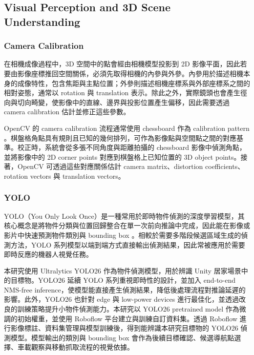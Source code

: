 \documentclass[12pt,a4paper]{article}
\begin{document}
\subsection{Visual Perception and 3D Scene Understanding}

\subsubsection{Camera Calibration}

在相機成像過程中，3D 空間中的點會經由相機模型投影到 2D 影像平面，因此若要由影像座標推回空間關係，必須先取得相機的內參與外參。內參用於描述相機本身的成像特性，包含焦距與主點位置；外參則描述相機座標系與外部座標系之間的相對姿態，通常以 rotation 與 translation 表示。除此之外，實際鏡頭也會產生徑向與切向畸變，使影像中的直線、邊界與投影位置產生偏移，因此需要透過 camera calibration 估計並修正這些參數。

OpenCV 的 camera calibration 流程通常使用 chessboard 作為 calibration pattern \cite{opencv_calib}。棋盤格角點具有規則且已知的幾何排列，可作為影像點與空間點之間的對應基準。校正時，系統會從多張不同角度與距離拍攝的 chessboard 影像中偵測角點，並將影像中的 2D corner points 對應到棋盤格上已知位置的 3D object points。接著，OpenCV 可透過這些對應關係估計 camera matrix、distortion coefficients、rotation vectors 與 translation vectors。

\subsubsection{YOLO}

YOLO（You Only Look Once）是一種常用於即時物件偵測的深度學習模型，其核心概念是將物件分類與位置回歸整合在單一次前向推論中完成，因此能在影像或影片中快速預測物件類別與 bounding box \cite{ultralytics_yolo}。相較於需要多階段候選區域生成的偵測方法，YOLO 系列模型以端到端方式直接輸出偵測結果，因此常被應用於需要即時反應的機器人視覺任務。

本研究使用 Ultralytics YOLO26 作為物件偵測模型，用於辨識 Unity 居家場景中的目標物。YOLO26 延續 YOLO 系列重視即時性的設計，並加入 end-to-end NMS-free inference，使模型能直接產生偵測結果，降低後處理流程對推論延遲的影響。此外，YOLO26 也針對 edge 與 low-power devices 進行最佳化，並透過改良的訓練策略提升小物件偵測能力。本研究以 YOLO26 pretrained model 作為微調的初始權重，並使用 Roboflow 平台建立與訓練自訂資料集。透過 Roboflow 進行影像標註、資料集管理與模型訓練後，得到能辨識本研究目標物的 YOLO26 偵測模型。模型輸出的類別與 bounding box 會作為後續目標確認、候選導航點選擇、車載觀察與移動抓取流程的視覺依據。
\end{document}
